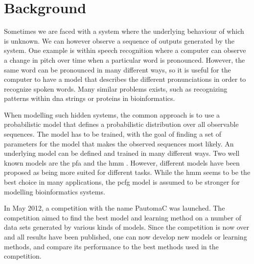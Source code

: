 \section{Background}
Sometimes we are faced with a system where the underlying behaviour of which is unknown. We can however observe a sequence of outputs generated by the system. One example is within speech recognition \cite{Rabiner89hmm} where a computer can observe a change in pitch over time when a particular word is pronounced. However, the same word can be pronounced in many different ways, so it is useful for the computer to have a model that describes the different pronunciations in order to recognize spoken words. Many similar problems exists, such as recognizing patterns within \gls{dna} strings or proteins in bioinformatics\cite{Sakakibara2005}.

When modelling such hidden systems, the common approach is to use a probabilistic model that defines a probabilistic distribution over all observable sequences. The model has to be trained, with the goal of finding a set of parameters for the model that makes the observed sequences most likely. An underlying model can be defined and trained in many different ways. Two well known models are the \gls{pfa} \cite{pazintroduction} and the \gls{hmm} \cite{Rabiner89hmm}. However, different models have been proposed as being more suited for different tasks. While the \gls{hmm} seems to be the best choice in many applications, the \gls{pcfg} model is assumed to be stronger for modelling bioinformatics systems\cite{Sakakibara2005}.

In May 2012, a competition with the name PautomaC was launched. The competition aimed to find the best model and learning method on a number of data sets generated by various kinds of models. Since the competition is now over and all results have been published, one can now develop new models or learning methods, and compare its performance to the best methods used in the competition.